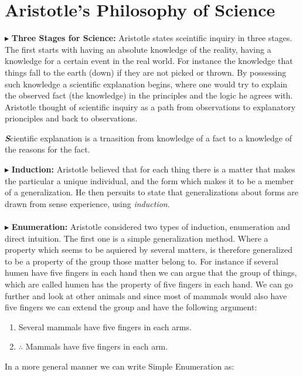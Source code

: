 \documentclass[9pt,a4paper,twocolumn]{article}
\newenvironment{callout}
	{\begin{calloutbox}\color{charcoal}\textbf\textit}
	{\end{calloutbox}}
\newcommand{\newpoint}[1]{\indent$\blacktriangleright$ \textbf{#1}}
\begin{document}
        \section{Aristotle's Philosophy of Science}
            \newpoint{Three Stages for Science: }Aristotle states sceintific inquiry in three stages. The first starts with having an absolute knowledge of the reality, having a knowledge for a certain event in the real world. For instance the knowledge that things fall to the earth (down) if they are not picked or thrown. By possessing such knowledge a scientific explanation begins, where one would try to explain the observed fact (the knowledge) in the principles and the logic he agrees with. Aristotle thought of scientific inquiry as a path from observations to explanatory prionciples and back to observations.\cite{Losee2001-cx}
            \begin{callout}
                Scientific explanation is a trnasition from knowledge of a fact to a knowledge of the reasons for the fact.
            \end{callout}
            \newpoint{Induction:} Aristotle believed that for each thing there is a matter that makes the particular a unique individual, and the form which makes it to be a member of a generalization. He then persuits to state that generalizations about forms are drawn from sense experience, using \textit{induction}. 
            \\
            \\
            \newpoint{Enumeration:} Aristotle considered two types of induction, enumeration and direct intuition. The first one is a simple generalization method. Where a property which seems to be aquiered by several matters, is therefore generalized to be a property of the group those matter belong to. For instance if several humen have five fingers in each hand then we can argue that the group of things, which are called humen has the property of five fingers in each hand. We can go further and look at other animals and since most of mammals would also have five fingers we can extend the group and have the following argument:
            \begin{enumerate}
                \item Several mammals have five fingers in each arms.
                \item $\therefore$ Mammals have five fingers in each arm.
            \end{enumerate}
            In a more general manner we can write Simple Enumeration as:
\end{document}
